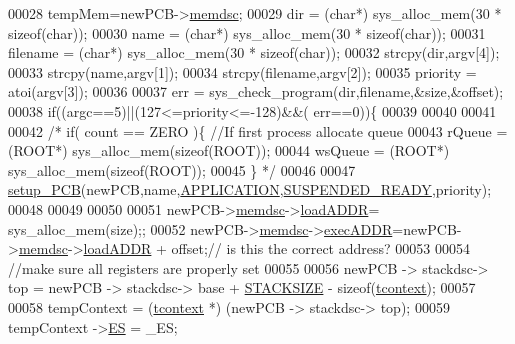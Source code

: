 \begin{DoxyCode}
00028         tempMem=newPCB->\hyperlink{structprocess_a163551ab7b60184b48e5d440fcd5c2b8}{memdsc};
00029         dir = (\textcolor{keywordtype}{char}*) sys\_alloc\_mem(30 * \textcolor{keyword}{sizeof}(\textcolor{keywordtype}{char}));
00030         name = (\textcolor{keywordtype}{char}*) sys\_alloc\_mem(30 * \textcolor{keyword}{sizeof}(\textcolor{keywordtype}{char}));
00031         filename = (\textcolor{keywordtype}{char}*) sys\_alloc\_mem(30 * \textcolor{keyword}{sizeof}(\textcolor{keywordtype}{char}));
00032         strcpy(dir,argv[4]);
00033         strcpy(name,argv[1]);
00034         strcpy(filename,argv[2]);
00035         priority = atoi(argv[3]);
00036         
00037         err = sys\_check\_program(dir,filename,&size,&offset);
00038         \textcolor{keywordflow}{if}((argc==5)||(127<=priority<=-128)&&( err==0))\{
00039                 
00040                 
00041 
00042               \textcolor{comment}{/*        if( count == ZERO )\{ //If first process allocate queue}
00043 \textcolor{comment}{                        rQueue = (ROOT*) sys\_alloc\_mem(sizeof(ROOT));}
00044 \textcolor{comment}{                        wsQueue = (ROOT*) sys\_alloc\_mem(sizeof(ROOT));}
00045 \textcolor{comment}{                \}   */}
00046 
00047                 \hyperlink{mpx__r2_8c_a316c9619aba53c03c17afbc0a0dbf096}{setup_PCB}(newPCB,name,\hyperlink{mpx__r2_8h_a796bd7c6ba2e59281760fb155c6287e8}{APPLICATION},\hyperlink{mpx__r2_8h_a07b1141143e8825b04670da23fca8cc7}{SUSPENDED_READY},priority);
00048 
00049 
00050                 
00051                 newPCB->\hyperlink{structprocess_a163551ab7b60184b48e5d440fcd5c2b8}{memdsc}->\hyperlink{structmem_a8f5a4db03ee0560e6bd4dd602ad753c0}{loadADDR}= sys\_alloc\_mem(size);;
00052                 newPCB->\hyperlink{structprocess_a163551ab7b60184b48e5d440fcd5c2b8}{memdsc}->\hyperlink{structmem_a5340491e17307817e6dca3b1d260d18a}{execADDR}=newPCB->\hyperlink{structprocess_a163551ab7b60184b48e5d440fcd5c2b8}{memdsc}->\hyperlink{structmem_a8f5a4db03ee0560e6bd4dd602ad753c0}{loadADDR} + offset;\textcolor{comment}{// is 
      this the correct address? }
00053                 
00054                 \textcolor{comment}{//make sure all registers are properly set}
00055                 
00056                 newPCB -> stackdsc-> top = newPCB -> stackdsc-> base + \hyperlink{mpx__r2_8h_a21d9543c516fffee84a7963224271f95}{STACKSIZE} 
      - \textcolor{keyword}{sizeof}(\hyperlink{structcontext}{tcontext});
00057                 
00058                 tempContext = (\hyperlink{structcontext}{tcontext} *) (newPCB -> stackdsc-> top);
00059                 tempContext ->\hyperlink{structcontext_a81a78fef7bda3a5dd852b28a905890ab}{ES} = \_ES;

\end{DoxyCode}
